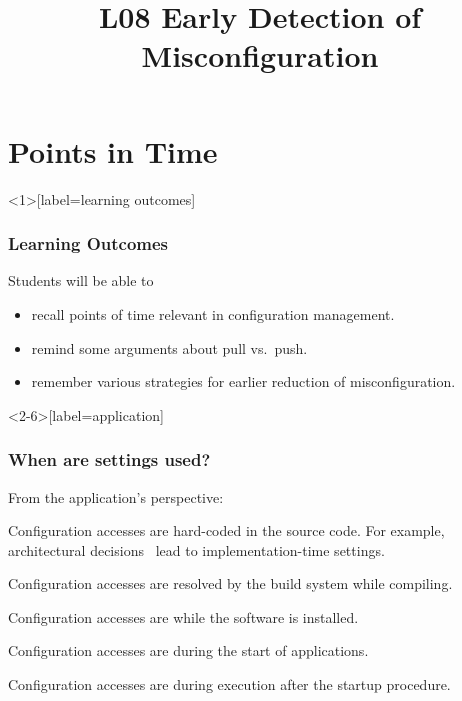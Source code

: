 

\title{L08 Early Detection of Misconfiguration}



\section{Points in Time}

\begin{frame}<1>[label=learning outcomes]
	\frametitle{Learning Outcomes}
	Students will be able to
	\begin{itemize}
	\item recall points of time relevant in configuration management.
	\item remind some arguments about pull vs.\ push.
	\item remember various strategies for earlier reduction of misconfiguration.
	\end{itemize}
\end{frame}

\begin{frame}<2-6>[label=application]
	\frametitle{When are settings used?}
	From the application's perspective:
	\vspace{1em}

	\pause

	\begin{description}[<+-| alert@+>]
	\item[Implementation-time:] Configuration accesses 
	are hard-coded in the sou\-rce code.
	For example, architectural decisions~\cite{zdun2007patterns} lead to impl\-ementation-time settings.

	\item[Compile-time:] Configuration accesses 
	are resolved by the build system while compiling.

	\item[Deployment-time:] Configuration accesses 
	are while the software is installed.

	\item[Load-time:] Configuration accesses 
	are during the start of applications.

	\item[Run-time:] Configuration accesses 
	are during execution after the startup procedure.
	\end{description}
\end{frame}


